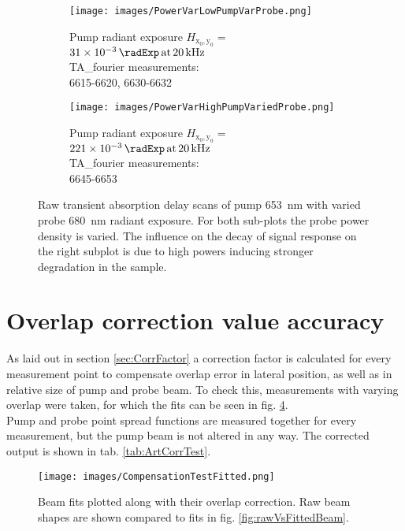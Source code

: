\documentclass[twoside,openright,listof=numbered]{scrreprt}
\def\pumpExp#1{\ensuremath{\SI{#1}{\radExp}\,\mathrm{at}\, \SI{20}{\kilo\hertz}}}
\def\radiantExp{\ensuremath{H_\mathrm{x_0,y_0}}}
\begin{document}
\begin{figure}[hp]
\centering
\begin{subfigure}[t]{0.45\textwidth}
\centering
\texttt{[image: images/PowerVarLowPumpVarProbe.png]} 
\caption{Pump radiant exposure $\radiantExp=$\pumpExp{31e-3}\\TA\_fourier measurements:\\ 6615-6620, 6630-6632\label{fig:PowerVarL}}
\end{subfigure}
\hfill
\begin{subfigure}[t]{0.45\textwidth}
\centering
\texttt{[image: images/PowerVarHighPumpVariedProbe.png]} 
\caption{Pump radiant exposure $\radiantExp=$\pumpExp{221e-3}\\TA\_fourier measurements:\\ 6645-6653\label{fig:PowerVarR}}
\end{subfigure}
\caption[Raw transient absorption delay scans of pump \qty{653}{\nano\meter} with varied probe \qty{680}{\nano\meter} radiant exposure.]{Raw transient absorption delay scans of pump \qty{653}{\nano\meter} with varied probe \qty{680}{\nano\meter} radiant exposure.
For both sub-plots the probe power density is varied. The influence on the decay of signal response on the right subplot is due to high powers inducing stronger degradation in the sample.}
\end{figure}

\FloatBarrier
\section{Overlap correction value accuracy}
As laid out in section \ref{sec:CorrFactor} a correction factor is calculated for every measurement point to compensate overlap error in lateral position, as well as in relative size of pump and probe beam.
To check this, measurements with varying overlap were taken, for which the fits can be seen in fig. \ref{fig:correctionComparison}.\\
Pump and probe point spread functions are measured together for every measurement, but the pump beam is not altered in any way. The corrected output is shown in tab. \ref{tab:ArtCorrTest}.\\

\begin{figure}[H]
\centering
\texttt{[image: images/CompensationTestFitted.png]}
\caption[Beam fits for overlap correction testing plotted along with their overlap correction.]{Beam fits plotted along with their overlap correction. Raw beam shapes are shown compared to fits in fig. \ref{fig:rawVsFittedBeam}.\label{fig:correctionComparison}}
\end{figure}
\end{document}
